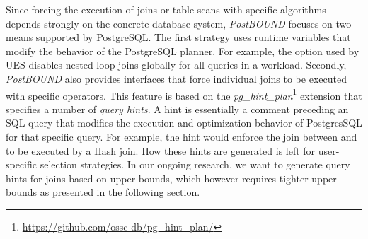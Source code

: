 Since forcing the execution of joins or table scans with specific algorithms depends strongly on the concrete database system, \emph{PostBOUND} focuses on two means supported by PostgreSQL. 
The first strategy uses runtime variables that modify the behavior of the PostgreSQL planner. 
For example, the \mbox{} option used by UES disables nested loop joins globally for all queries in a workload. 
Secondly, \emph{PostBOUND} also provides interfaces that force individual joins to be executed with specific operators. 
This feature is based on the \emph{pg\_hint\_plan}\footnote{\url{https://github.com/ossc-db/pg_hint_plan/}} extension that specifies a number of \emph{query hints}. 
A hint is essentially a comment preceding an SQL query that modifies the execution and optimization behavior of PostgresSQL for that specific query. 
For example, the hint  would enforce the join between  and  to be executed by a Hash join. 
How these hints are generated is left for user-specific selection strategies. 
In our ongoing research, we want to generate query hints for joins based on upper bounds, which however requires tighter upper bounds as presented in the following section.


